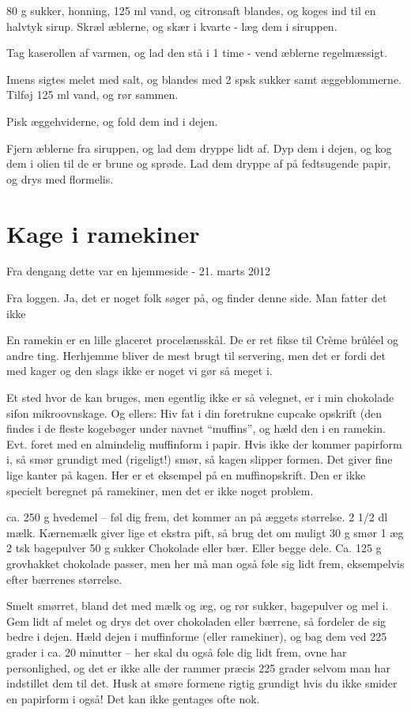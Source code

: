 \documentclass[
  letterpaper,
  DIV=11,
  numbers=noendperiod]{scrreprt}
\begin{document}
80 g sukker, honning, 125 ml vand, og citronsaft blandes, og koges ind
til en halvtyk sirup. Skræl æblerne, og skær i kvarte - læg dem i
siruppen.

Tag kaserollen af varmen, og lad den stå i 1 time - vend æblerne
regelmæssigt.

Imens sigtes melet med salt, og blandes med 2 spsk sukker samt
æggeblommerne. Tilføj 125 ml vand, og rør sammen.

Pisk æggehviderne, og fold dem ind i dejen.

Fjern æblerne fra siruppen, og lad dem dryppe lidt af. Dyp dem i dejen,
og kog dem i olien til de er brune og sprøde. Lad dem dryppe af på
fedtsugende papir, og drys med flormelis.

\hypertarget{kage-i-ramekiner}{%
\section{Kage i ramekiner}\label{kage-i-ramekiner}}

Fra dengang dette var en hjemmeside - 21. marts 2012

Fra loggen. Ja, det er noget folk søger på, og finder denne side. Man
fatter det ikke

En ramekin er en lille glaceret procelænsskål. De er ret fikse til Crème
brûléel og andre ting. Herhjemme bliver de mest brugt til servering, men
det er fordi det med kager og den slags ikke er noget vi gør så meget
i.~

Et sted hvor de kan bruges, men egentlig ikke er så velegnet, er i min
chokolade sifon mikroovnskage. Og ellers: Hiv fat i din foretrukne
cupcake opskrift (den findes i de fleste kogebøger under navnet
``muffins'', og hæld den i en ramekin. Evt. foret med en almindelig
muffinform i papir. Hvis ikke der kommer papirform i, så smør grundigt
med (rigeligt!) smør, så kagen slipper formen. Det giver fine lige
kanter på kagen. Her er et eksempel på en muffinopskrift. Den er ikke
specielt beregnet på ramekiner, men det er ikke noget problem.

ca. 250 g hvedemel -- føl dig frem, det kommer an på æggets størrelse. 2
1/2 dl mælk. Kærnemælk giver lige et ekstra pift, så brug det om muligt
30 g smør 1 æg 2 tsk bagepulver 50 g sukker Chokolade eller bær. Eller
begge dele. Ca. 125 g grovhakket chokolade passer, men her må man også
føle sig lidt frem, eksempelvis efter bærrenes størrelse.

Smelt smørret, bland det med mælk og æg, og rør sukker, bagepulver og
mel i. Gem lidt af melet og drys det over chokoladen eller bærrene, så
fordeler de sig bedre i dejen. Hæld dejen i muffinforme (eller
ramekiner), og bag dem ved 225 grader i ca. 20 minutter -- her skal du
også føle dig lidt frem, ovne har personlighed, og det er ikke alle der
rammer præcis 225 grader selvom man har indstillet dem til det. Husk at
smøre formene rigtig grundigt hvis du ikke smider en papirform i også!
Det kan ikke gentages ofte nok.
\end{document}
